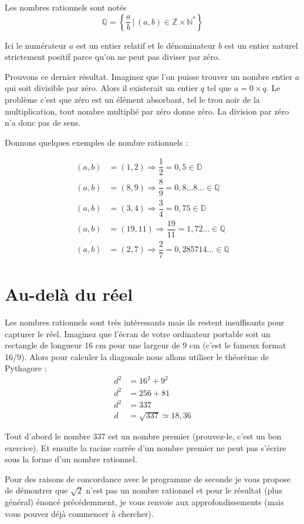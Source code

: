 \documentclass[a4paper, 11pt, twoside]{book}
\newcommand{\N}{\mathbb{N}}
\newcommand{\Z}{\mathbb{Z}}
\newcommand{\D}{\mathbb{D}}
\newcommand{\Q}{\mathbb{Q}}
\begin{document}
Les nombres rationnels sont notés \[\Q =
   \left\{\dfrac{a}{b}\,|\,(a,
   b)\in\Z\times\N^*\right\}\]

Ici le numérateur \(a\) est un entier relatif et le dénominateur \(b\)
est un entier naturel strictement positif parce qu'on ne peut pas
diviser par zéro.

Prouvons ce dernier résultat. Imaginez que l'on puisse trouver un
nombre entier \(a\) qui soit divisible par zéro. Alors il existerait
un entier \(q\) tel que \(a = 0\times q\). Le problème c'est que zéro
est un élément absorbant, tel le trou noir de la multiplication,
tout nombre multiplié par zéro donne zéro. La division par zéro n'a
donc pas de sens.

Donnons quelques exemples de nombre rationnels :

\begin{align*}
(a, b) &= (1, 2)\Rightarrow \dfrac{1}{2} = 0,5\in\D\\
(a, b) &= (8, 9)\Rightarrow \dfrac{8}{9} = 0,8\dots 8\dots\in\Q\\
(a, b) &= (3, 4)\Rightarrow \dfrac{3}{4} = 0,75\in\D\\
(a, b) &= (19, 11)\Rightarrow \dfrac{19}{11} = 1,72\dots \in\Q\\
(a, b) &= (2, 7)\Rightarrow \dfrac{2}{7} = 0,285714\dots \in\Q
\end{align*}

\section{Au-delà du réel}
\label{sec:org0c1dbcd}

Les nombres rationnels sont très intéressants mais ils restent
insuffisants pour capturer le réel. Imaginez que l'écran de votre
ordinateur portable soit un rectangle de longueur 16 cm pour une
largeur de 9 cm (c'est le fameux format 16/9). Alors pour calculer
la diagonale nous allons utiliser le théorème de Pythagore :
\begin{align*}
d^2 &= 16^2 + 9^2\\
d^2 &= 256 + 81\\
d^2 &= 337\\
d &= \sqrt{337} \simeq 18,36
\end{align*}

Tout d'abord le nombre 337 est un nombre premier (prouvez-le, c'est
un bon exercice). Et ensuite la racine carrée d'un nombre premier
ne peut pas s'écrire sous la forme d'un nombre rationnel.

Pour des raisons de concordance avec le programme de seconde je
vous propose de démontrer que \(\sqrt{2}\) n'est pas un nombre
rationnel et pour le résultat (plus général) énoncé précédemment,
je vous renvoie aux approfondissements (mais vous pouvez déjà
commencer à chercher).
\end{document}

